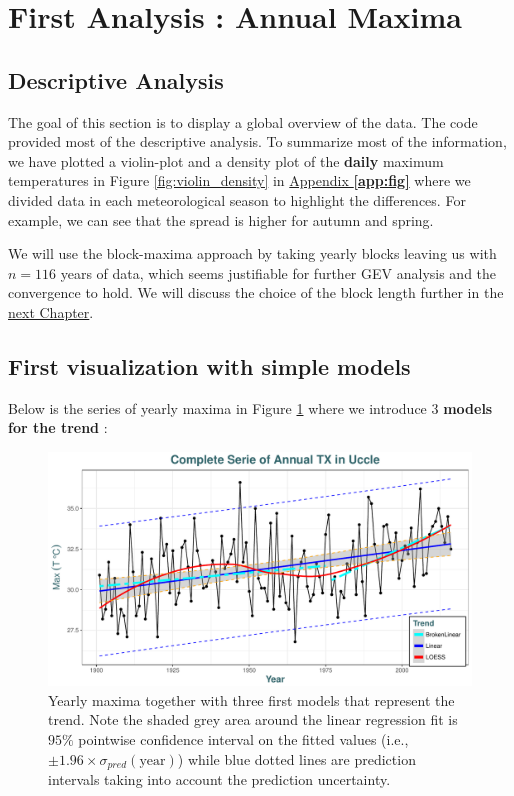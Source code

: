 \section{First Analysis : Annual Maxima}\label{sec:firstana}


\subsection{Descriptive Analysis}

The goal of this section is to display a global overview of the data. The code provided most of the descriptive analysis. To summarize most of the information, we have plotted a violin-plot and a density plot of the \textbf{daily} maximum temperatures in Figure \ref{fig:violin_density} in \hyperref[app:fig]{Appendix \textbf{\ref{app:fig}}} where we divided data in each meteorological season to highlight the differences. For example, we can see that the spread is higher for autumn and spring.

We will use the block-maxima approach by taking yearly blocks leaving us with $n=116$ years of data, which seems justifiable for further GEV analysis and the convergence to hold. We will discuss the choice of the block length further in the \hyperref[sec:anagev]{next Chapter}.

\subsection{First visualization with simple models}\label{sec:firstvisu}

Below is the series of yearly maxima in Figure \ref{first_fig} where we introduce 3 \textbf{models for the trend} :


\begin{figure}[!htb]
	\centering\includegraphics[width=.8\linewidth]{gg12.pdf}\caption{Yearly maxima together with three first models that represent the trend. Note the shaded grey area around the linear regression fit is $95\%$ pointwise confidence interval on the fitted values (i.e., $\pm 1.96\times \sigma_{pred}(\text{year})$) while blue dotted lines are prediction intervals taking into account the prediction uncertainty.}%
\label{first_fig}
\end{figure}


